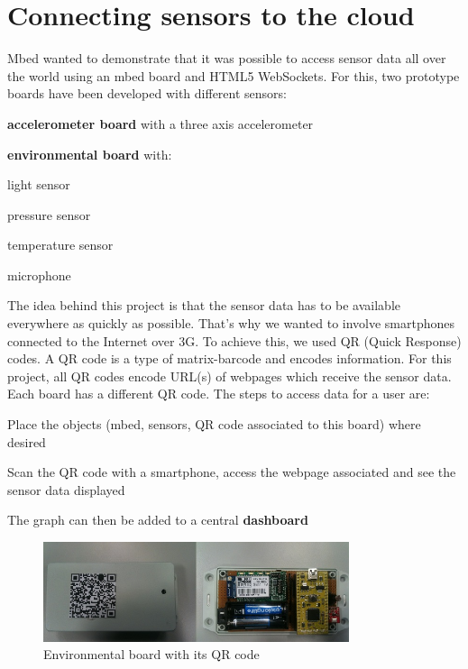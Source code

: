 \documentclass[pdftex,10pt,a4paper]{report}
\newenvironment{packed_item}{
\begin{itemize}
  \setlength{\itemsep}{1pt}
  \setlength{\parskip}{0pt}
  \setlength{\parsep}{0pt}
}{\end{itemize}}
\begin{document}
\newpage









\section{Connecting sensors to the cloud}
Mbed wanted to demonstrate that it was possible to access sensor data all over the world using an mbed board and HTML5 WebSockets. For this, two prototype boards have been developed with different sensors:

\begin{packed_item}
	\item \textbf{accelerometer board} with a three axis accelerometer
	\item \textbf{environmental board} with:
		\begin{packed_item}
			\item light sensor
			\item pressure sensor
			\item temperature sensor
			\item microphone
		\end{packed_item}
\end {packed_item}

The idea behind this project is that the sensor data has to be available everywhere as quickly as possible. That's why we wanted to involve smartphones connected to the Internet over 3G. To achieve this, we used QR (Quick Response) codes. A QR code is a type of matrix-barcode and encodes information. For this project, all QR codes encode URL(s) of webpages which receive the sensor data. Each board has a different QR code. The steps to access data for a user are:

\begin{packed_item}
	\item Place the objects (mbed, sensors, QR code associated to this board) where desired
	\item Scan the QR code with a smartphone, access the webpage associated and see the sensor data displayed
	\item The graph can then be added to a central \textbf{dashboard}
\end{packed_item}

\begin{figure}[h!]
		\centering
		\includegraphics[width=0.8\textwidth]{./env_board_qr.jpg}
		\caption{Environmental board with its QR code}
		\label{Environmental board with its QR code}
\end{figure}
\end{document}
